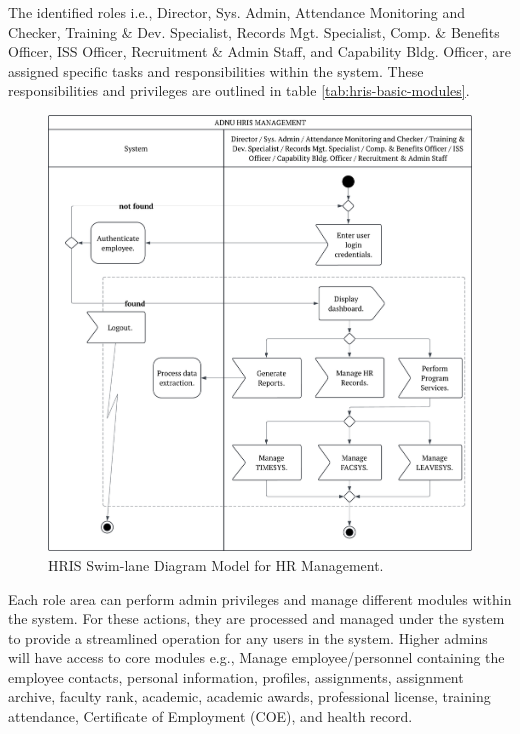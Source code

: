     The identified roles i.e., Director, Sys. Admin, Attendance Monitoring and Checker, Training \& Dev. Specialist, Records Mgt. Specialist, Comp. \& Benefits Officer, ISS Officer, Recruitment \& Admin Staff, and Capability Bldg. Officer, are assigned specific tasks and responsibilities within the system. These responsibilities and privileges are outlined in table \ref*{tab:hris-basic-modules}. 

    \begin{figure}[H]
        \centering
        \includegraphics[width=1\linewidth]{figures/images/swimlane-admins.png}
        \caption{HRIS Swim-lane Diagram Model for HR Management.}
        \label{fig:swimlane-admins}
    \end{figure}

    Each role area can perform admin privileges and manage different modules within the system. For these actions, they are processed and managed under the system to provide a streamlined operation for any users in the system. Higher admins will have access to core modules e.g., Manage employee/personnel containing the employee contacts, personal information, profiles, assignments, assignment archive, faculty rank, academic, academic awards, professional license, training attendance, Certificate of Employment (COE), and health record.

